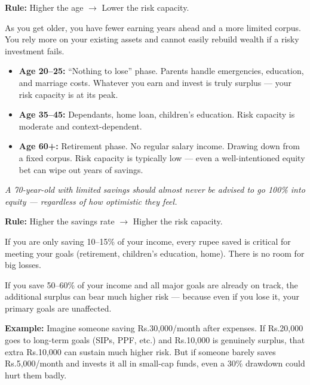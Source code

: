 \documentclass[12pt,a4paper]{article}
\makeatletter
\newcommand{\rupee}{Rs.\@}
\newcommand{\faCalendar}{\ding{111}}
\newcommand{\faPiggyBank}{\ding{108}}
\makeatother
\begin{document}
\vspace{3mm}

\begin{tcolorbox}[base, colback=CapacityColor!8, colframe=CapacityColor,
  title={\faCalendar\;\textbf{Factor 1: Age}},
  fonttitle=\bfseries\color{white}, colbacktitle=CapacityColor]

\textbf{Rule:} Higher the age $\longrightarrow$ Lower the risk capacity.

\medskip
As you get older, you have fewer earning years ahead and a more limited corpus. You rely more on your existing assets and cannot easily rebuild wealth if a risky investment fails.

\medskip
\begin{itemize}
  \item \textbf{Age 20--25:} ``Nothing to lose'' phase. Parents handle emergencies, education, and marriage costs. Whatever you earn and invest is truly surplus --- your risk capacity is at its peak.
  \item \textbf{Age 35--45:} Dependants, home loan, children's education. Risk capacity is moderate and context-dependent.
  \item \textbf{Age 60+:} Retirement phase. No regular salary income. Drawing down from a fixed corpus. Risk capacity is typically low --- even a well-intentioned equity bet can wipe out years of savings.
\end{itemize}

\medskip
\textit{A 70-year-old with limited savings should almost never be advised to go 100\% into equity --- regardless of how optimistic they feel.}
\end{tcolorbox}

\vspace{3mm}

\begin{tcolorbox}[base, colback=AccentTeal!8, colframe=AccentTeal,
  title={\faPiggyBank\;\textbf{Factor 2: Savings Rate}},
  fonttitle=\bfseries\color{white}, colbacktitle=AccentTeal]

\textbf{Rule:} Higher the savings rate $\longrightarrow$ Higher the risk capacity.

\medskip
If you are only saving 10--15\% of your income, every rupee saved is critical for meeting your goals (retirement, children's education, home). There is no room for big losses.

\medskip
If you save 50--60\% of your income and all major goals are already on track, the additional surplus can bear much higher risk --- because even if you lose it, your primary goals are unaffected.

\medskip
\textbf{Example:} Imagine someone saving \rupee{}30,000/month after expenses. If \rupee{}20,000 goes to long-term goals (SIPs, PPF, etc.) and \rupee{}10,000 is genuinely surplus, that extra \rupee{}10,000 can sustain much higher risk. But if someone barely saves \rupee{}5,000/month and invests it all in small-cap funds, even a 30\% drawdown could hurt them badly.
\end{tcolorbox}
\end{document}

